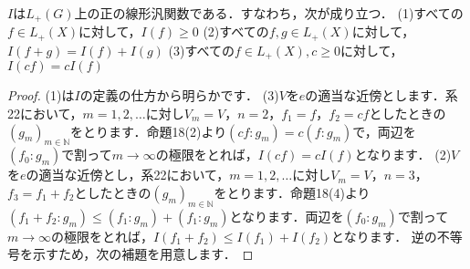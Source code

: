 \begin{prop}
$I$は$L_{+}(G)$上の正の線形汎関数である．すなわち，次が成り立つ．
(1)すべての$f \in L_{+}(X)$に対して，$I(f) \ge 0$
(2)すべての$f,g \in L_{+}(X)$に対して，$I(f+g)=I(f)+I(g)$
(3)すべての$f \in L_{+}(X), c \ge 0$に対して，$I(cf)=cI(f)$
\end{prop}
\begin{proof}
(1)は$I$の定義の仕方から明らかです．
(3)$V$を$e$の適当な近傍とします．系22において，$m=1,2,\ldots$に対し$V_m=V$，$n=2$，$f_1=f$，$f_2=cf$としたときの$(g_m)_{m \in \mathbb{N}}$をとります．命題18(2)より$(cf \colon g_m)=c(f \colon g_m)$で，両辺を$(f_0 \colon g_m)$で割って$m \to \infty$の極限をとれば，$I(cf)=cI(f)$となります．
(2)$V$を$e$の適当な近傍とし，系22において，$m=1,2,\ldots$に対し$V_m=V$，$n=3$，$f_3=f_1+f_2$としたときの$(g_m)_{m \in \mathbb{N}}$をとります．命題18(4)より$(f_{1}+f_{2} \colon g_m ) \le (f_1 \colon g_m )+(f_1 \colon g_m)$となります．両辺を$(f_0 \colon g_m)$で割って$m \to \infty$の極限をとれば，$I(f_1+f_2) \le I(f_1)+I(f_2)$となります．
逆の不等号を示すため，次の補題を用意します．


\end{proof}
